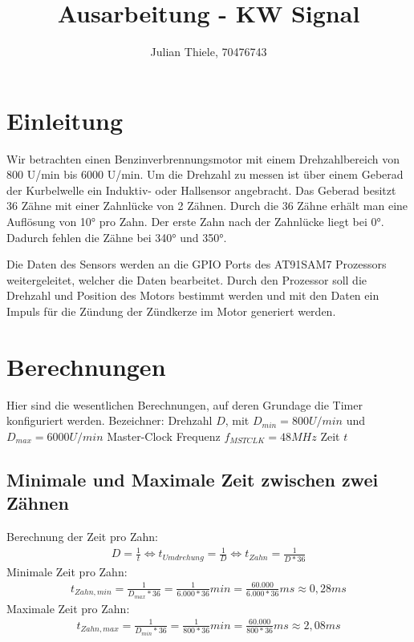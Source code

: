 \documentclass[12pt]{article}
\title{Ausarbeitung - KW Signal}
\author{Julian Thiele, 70476743}
\begin{document}
\sloppy

\maketitle
\newpage
\tableofcontents
\newpage

\section{Einleitung}
Wir betrachten einen Benzinverbrennungsmotor mit einem Drehzahlbereich von 800 U/min bis 6000 U/min.
Um die Drehzahl zu messen ist über einem Geberad der Kurbelwelle ein Induktiv- oder Hallsensor angebracht.
Das Geberad besitzt 36 Zähne mit einer Zahnlücke von 2 Zähnen.
Durch die 36 Zähne erhält man eine Auflösung von 10° pro Zahn.
Der erste Zahn nach der Zahnlücke liegt bei 0°. Dadurch fehlen die Zähne bei 340° und 350°.

Die Daten des Sensors werden an die GPIO Ports des AT91SAM7 Prozessors weitergeleitet, welcher die Daten bearbeitet.
Durch den Prozessor soll die Drehzahl und Position des Motors bestimmt werden und mit den Daten
ein Impuls für die Zündung der Zündkerze im Motor generiert werden.

\section{Berechnungen}
Hier sind die wesentlichen Berechnungen, auf deren Grundage die Timer konfiguriert werden.\newline\newline
Bezeichner:\newline
Drehzahl $D$, mit $D_{min} = 800 U/min$ und $D_{max} = 6000 U/min$ \newline
Master-Clock Frequenz $f_{MSTCLK} = 48MHz$ \newline
Zeit $t$ \newline


\subsection{Minimale und Maximale Zeit zwischen zwei Zähnen}

Berechnung der Zeit pro Zahn:
\begin{gather}
    D = \frac{1}{t} \Leftrightarrow t_{Umdrehung} = \frac{1}{D} \Leftrightarrow t_{Zahn} = \frac{1}{D * 36}
\end{gather}
Minimale Zeit pro Zahn:
\begin{gather}
    t_{Zahn,min} = \frac{1}{D_{max} * 36} = \frac{1}{6.000 * 36}min = 
    \frac{60.000}{6.000 * 36}ms \approx 0,28ms
\end{gather}
Maximale Zeit pro Zahn:
\begin{gather}
    t_{Zahn,max} = \frac{1}{D_{min} * 36} = \frac{1}{800 * 36}min = 
    \frac{60.000}{800 * 36}ms \approx 2,08ms
\end{gather}
\end{document}
